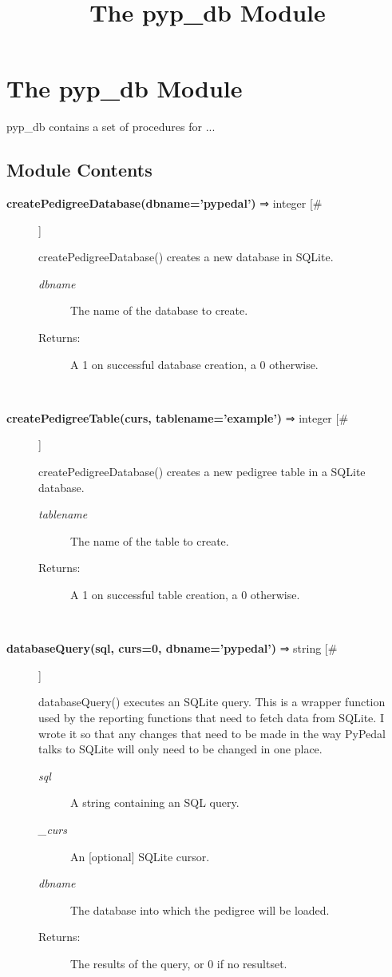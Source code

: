 \documentclass[10pt]{article}
\title{The pyp\_db Module}
\begin{document}
\section*{The pyp\_db Module}


 pyp\_db contains a set of procedures for ...
\subsection*{Module Contents}
\begin{description}
\item[\textbf{createPedigreeDatabase(dbname='pypedal')}
 ⇒ integer [\#]]

 createPedigreeDatabase() creates a new database in SQLite.
\begin{description}
\item[\emph{dbname}
] The name of the database to create.
\item[Returns:] A 1 on successful database creation, a 0 otherwise.

\end{description}
\\ 

\item[\textbf{createPedigreeTable(curs, tablename='example')}
 ⇒ integer [\#]]

 createPedigreeDatabase() creates a new pedigree table in a SQLite database.
\begin{description}
\item[\emph{tablename}
] The name of the table to create.
\item[Returns:] A 1 on successful table creation, a 0 otherwise.

\end{description}
\\ 

\item[\textbf{databaseQuery(sql, curs=0, dbname='pypedal')}
 ⇒ string [\#]]

 databaseQuery() executes an SQLite query. This is a wrapper function used by the reporting functions that need to fetch data from SQLite. I wrote it so that any changes that need to be made in the way PyPedal talks to SQLite will only need to be changed in one place.
\begin{description}
\item[\emph{sql}
] A string containing an SQL query.
\item[\emph{\_curs}
] An [optional] SQLite cursor.
\item[\emph{dbname}
] The database into which the pedigree will be loaded.
\item[Returns:] The results of the query, or 0 if no resultset.


\end{description}
\end{description}
\end{document}
